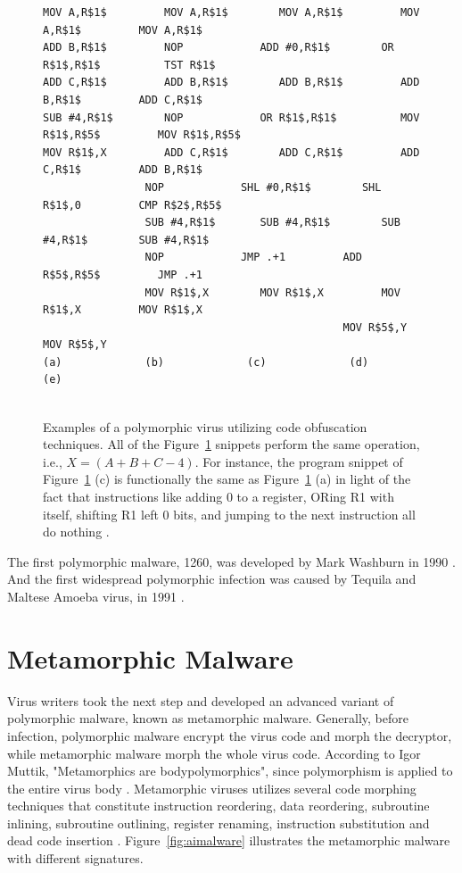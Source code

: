 \begin{figure}
  \centering
\begin{lstlisting}[language=myasm]
MOV A,R$1$         MOV A,R$1$        MOV A,R$1$         MOV A,R$1$         MOV A,R$1$
ADD B,R$1$         NOP            ADD #0,R$1$        OR R$1$,R$1$          TST R$1$
ADD C,R$1$         ADD B,R$1$        ADD B,R$1$         ADD B,R$1$         ADD C,R$1$
SUB #4,R$1$        NOP            OR R$1$,R$1$          MOV R$1$,R$5$         MOV R$1$,R$5$
MOV R$1$,X         ADD C,R$1$        ADD C,R$1$         ADD C,R$1$         ADD B,R$1$
                NOP            SHL #0,R$1$        SHL R$1$,0         CMP R$2$,R$5$
                SUB #4,R$1$       SUB #4,R$1$        SUB #4,R$1$        SUB #4,R$1$
                NOP            JMP .+1         ADD R$5$,R$5$         JMP .+1
                MOV R$1$,X        MOV R$1$,X         MOV R$1$,X         MOV R$1$,X
                                               MOV R$5$,Y         MOV R$5$,Y
(a)             (b)             (c)             (d)             (e)


\end{lstlisting}
    \caption[Examples of a polymorphic virus.]{Examples of a polymorphic virus utilizing code obfuscation techniques. All of the Figure~\ref{fig:polyvirus} snippets perform the same operation, i.e.,  $X = (A + B + C - 4)$. For instance, the program snippet of Figure~\ref{fig:polyvirus} (c) is functionally the same as Figure~\ref{fig:polyvirus} (a) in light of the fact that instructions like adding 0 to a register, ORing R1 with itself, shifting R1 left 0 bits, and jumping to the next instruction all do nothing \cite{bib19}.}
    \label{fig:polyvirus}
\end{figure}

    
The first polymorphic malware, 1260, was developed by Mark Washburn in 1990 \cite{bib15}. And the first widespread polymorphic infection was caused by Tequila and Maltese Amoeba virus, in 1991 \cite{bib14}.

\section{Metamorphic Malware} 

Virus writers took the next step and developed an advanced variant of polymorphic malware, known as metamorphic malware. Generally, before infection, polymorphic malware encrypt the virus code and morph the decryptor, while metamorphic malware morph the whole virus code. According to Igor Muttik, "Metamorphics are bodypolymorphics", since polymorphism is applied to the entire virus body \cite{bib22}. Metamorphic viruses utilizes several code morphing techniques that constitute instruction reordering, data reordering, subroutine inlining, subroutine outlining, register renaming, instruction substitution and dead code insertion \cite{bib23}. Figure~\ref{fig:aimalware} illustrates the metamorphic malware with different signatures.


